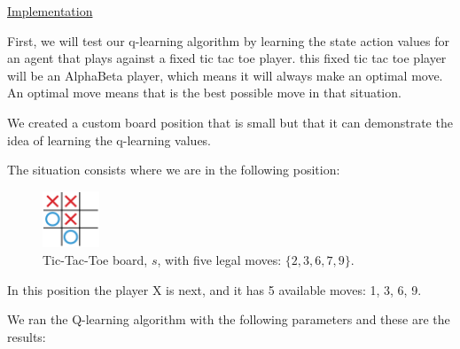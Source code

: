 \documentclass{article}
\begin{document}

\noindent
\href{https://github.com/davidrobles/mlnd-capstone-code/blob/master/examples/tictactoe-qlearning.py}
     {Implementation}
\break

First, we will test our q-learning algorithm by learning the state action values for an agent that
plays against a fixed tic tac toe player. this fixed tic tac toe player will be an AlphaBeta player,
which means it will always make an optimal move. An optimal move means that is the best possible
move in that situation.

We created a custom board position that is small but that it can demonstrate the idea of learning
the q-learning values.

The situation consists where we are in the following position:


\begin{figure}[!h]
    \centering
    \includegraphics[width=0.15\textwidth]{figures/tic/tic-1.pdf}
    \caption{Tic-Tac-Toe board, $s$, with five legal moves: $\{2, 3, 6, 7, 9\}$.}
    \label{fig:tic-play32}
\end{figure}

In this position the player X is next, and it has 5 available moves: 1, 3, 6, 9.


We ran the Q-learning algorithm with the following parameters and these are the results:


\end{document}
